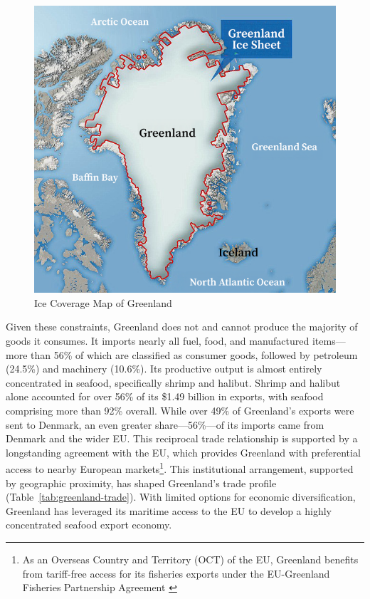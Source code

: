 \documentclass{adonis}
\begin{document}
    \begin{figure}[H]
        \centering
        \includegraphics[width=0.5\linewidth]{greenland-ice-sheet.png}
        \caption{Ice Coverage Map of Greenland \citep{plummer2016greenland}}
        \label{fig:greenland-ice-map}
    \end{figure}
   Given these constraints, Greenland does not and cannot produce the majority of goods it consumes. It imports nearly all fuel, food, and manufactured items—more than 56\% of which are classified as consumer goods, followed by petroleum (24.5\%) and machinery (10.6\%). Its productive output is almost entirely concentrated in seafood, specifically shrimp and halibut. Shrimp and halibut alone accounted for over 56\% of its \$1.49 billion in exports, with seafood comprising more than 92\% overall. While over 49\% of Greenland’s exports were sent to Denmark, an even greater share—56\%—of its imports came from Denmark and the wider EU. This reciprocal trade relationship is supported by a longstanding agreement with the EU, which provides Greenland with preferential access to nearby European markets\footnote{As an Overseas Country and Territory (OCT) of the EU, Greenland benefits from tariff-free access for its fisheries exports under the EU-Greenland Fisheries Partnership Agreement \citep{oec2025}}. This institutional arrangement, supported by geographic proximity, has shaped Greenland’s trade profile  (Table~\ref{tab:greenland-trade}). With limited options for economic diversification, Greenland has leveraged its maritime access to the EU to develop a highly concentrated seafood export economy. 
\end{document}
